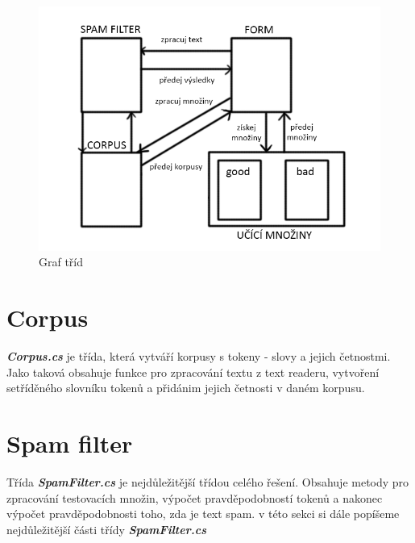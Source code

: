 \documentclass{semestralka}
\begin{document}
\begin{figure}[!ht]
  \centering
  \caption{Graf tříd}
    \includegraphics[width=\textwidth]{grafPredavani.png}
\end{figure}

\section{Corpus}
\textbf{\textit{Corpus.cs}} je třída, která vytváří korpusy s tokeny - slovy a jejich četnostmi. Jako taková obsahuje funkce pro zpracování textu z text readeru, vytvoření setříděného slovníku tokenů a přidánim jejich četnosti v daném korpusu.

\section{Spam filter}
Třída \textbf{\textit{SpamFilter.cs}} je nejdůležitější třídou celého řešení. Obsahuje metody pro zpracování testovacích množin, výpočet pravděpodobností tokenů a nakonec výpočet pravděpodobnosti toho, zda je text spam. v této sekci si dále popíšeme nejdůležitější části třídy \textbf{\textit{SpamFilter.cs}}
\end{document}
